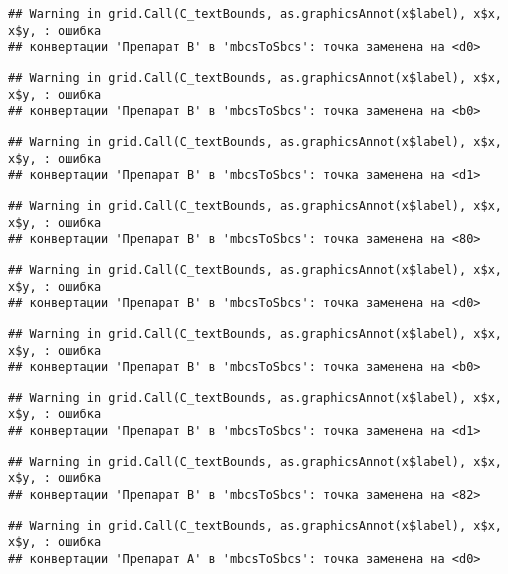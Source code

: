 \documentclass[
]{article}
\begin{document}
\begin{verbatim}
## Warning in grid.Call(C_textBounds, as.graphicsAnnot(x$label), x$x, x$y, : ошибка
## конвертации 'Препарат B' в 'mbcsToSbcs': точка заменена на <d0>
\end{verbatim}

\begin{verbatim}
## Warning in grid.Call(C_textBounds, as.graphicsAnnot(x$label), x$x, x$y, : ошибка
## конвертации 'Препарат B' в 'mbcsToSbcs': точка заменена на <b0>
\end{verbatim}

\begin{verbatim}
## Warning in grid.Call(C_textBounds, as.graphicsAnnot(x$label), x$x, x$y, : ошибка
## конвертации 'Препарат B' в 'mbcsToSbcs': точка заменена на <d1>
\end{verbatim}

\begin{verbatim}
## Warning in grid.Call(C_textBounds, as.graphicsAnnot(x$label), x$x, x$y, : ошибка
## конвертации 'Препарат B' в 'mbcsToSbcs': точка заменена на <80>
\end{verbatim}

\begin{verbatim}
## Warning in grid.Call(C_textBounds, as.graphicsAnnot(x$label), x$x, x$y, : ошибка
## конвертации 'Препарат B' в 'mbcsToSbcs': точка заменена на <d0>
\end{verbatim}

\begin{verbatim}
## Warning in grid.Call(C_textBounds, as.graphicsAnnot(x$label), x$x, x$y, : ошибка
## конвертации 'Препарат B' в 'mbcsToSbcs': точка заменена на <b0>
\end{verbatim}

\begin{verbatim}
## Warning in grid.Call(C_textBounds, as.graphicsAnnot(x$label), x$x, x$y, : ошибка
## конвертации 'Препарат B' в 'mbcsToSbcs': точка заменена на <d1>
\end{verbatim}

\begin{verbatim}
## Warning in grid.Call(C_textBounds, as.graphicsAnnot(x$label), x$x, x$y, : ошибка
## конвертации 'Препарат B' в 'mbcsToSbcs': точка заменена на <82>
\end{verbatim}

\begin{verbatim}
## Warning in grid.Call(C_textBounds, as.graphicsAnnot(x$label), x$x, x$y, : ошибка
## конвертации 'Препарат A' в 'mbcsToSbcs': точка заменена на <d0>
\end{verbatim}
\end{document}
